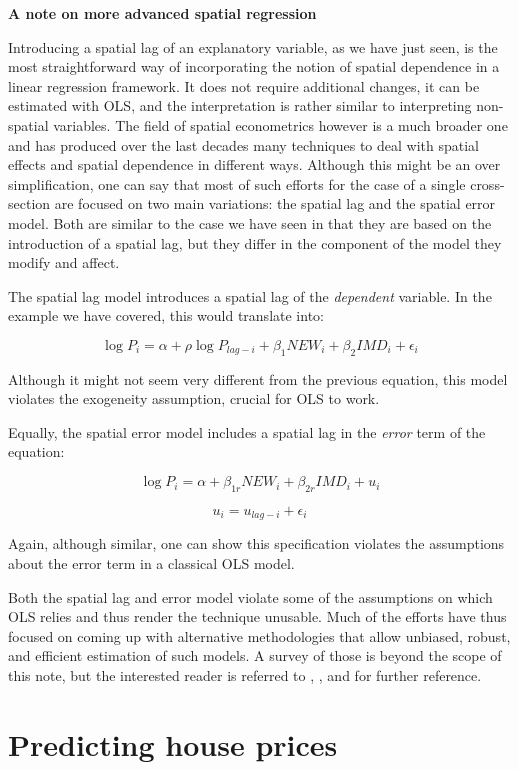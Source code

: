 \documentclass[
]{book}
\begin{document}
\textbf{A note on more advanced spatial regression}

Introducing a spatial lag of an explanatory variable, as we have just seen, is the most straightforward way of incorporating the notion of spatial dependence in a linear regression framework. It does not require additional changes, it can be estimated with OLS, and the interpretation is rather similar to interpreting non-spatial variables. The field of spatial econometrics however is a much broader one and has produced over the last decades many techniques to deal with spatial effects and spatial dependence in different ways. Although this might be an over simplification, one can say that most of such efforts for the case of a single cross-section are focused on two main variations: the spatial lag and the spatial error model. Both are similar to the case we have seen in that they are based on the introduction of a spatial lag, but they differ in the component of the model they modify and affect.

The spatial lag model introduces a spatial lag of the \emph{dependent} variable. In the example we have covered, this would translate into:

\[
\log{P_i} = \alpha + \rho \log{P_{lag-i}} + \beta_{1} NEW_i + \beta_{2} IMD_i + \epsilon_i
\]

Although it might not seem very different from the previous equation, this model violates the exogeneity assumption, crucial for OLS to work.

Equally, the spatial error model includes a spatial lag in the \emph{error} term of the equation:

\[
\log{P_i} = \alpha + \beta_{1r} NEW_i + \beta_{2r} IMD_i + u_i
\]

\[
u_i = u_{lag-i} + \epsilon_i
\]

Again, although similar, one can show this specification violates the assumptions about the error term in a classical OLS model.

Both the spatial lag and error model violate some of the assumptions on which OLS relies and thus render the technique unusable. Much of the efforts have thus focused on coming up with alternative methodologies that allow unbiased, robust, and efficient estimation of such models. A survey of those is beyond the scope of this note, but the interested reader is referred to \citet{anselin1988spatial}, \citet{anselin2003spatial}, and \citet{anselin2014modern} for further reference.

\hypertarget{predicting-house-prices}{%
\section{Predicting house prices}\label{predicting-house-prices}}
\end{document}
